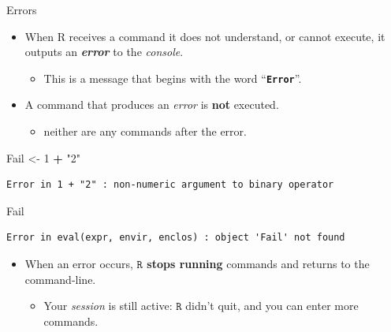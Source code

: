 \documentclass[
  11pt,
  ignorenonframetext,
]{beamer}
\newenvironment{Shaded}{\begin{snugshade}}{\end{snugshade}}
\newcommand{\DecValTok}[1]{\textcolor[rgb]{0.00,0.00,0.81}{#1}}
\newcommand{\ErrorTok}[1]{\textcolor[rgb]{0.64,0.00,0.00}{\textbf{#1}}}
\newcommand{\NormalTok}[1]{#1}
\newcommand{\OtherTok}[1]{\textcolor[rgb]{0.56,0.35,0.01}{#1}}
\newcommand{\SpecialCharTok}[1]{\textcolor[rgb]{0.81,0.36,0.00}{\textbf{#1}}}
\newcommand{\StringTok}[1]{\textcolor[rgb]{0.31,0.60,0.02}{#1}}
\providecommand{\tightlist}{%
  \setlength{\itemsep}{0pt}\setlength{\parskip}{0pt}}
\begin{document}
\begin{frame}[fragile]{Errors}
\protect\hypertarget{errors}{}
\begin{itemize}
\tightlist
\item
  When R receives a command it does not understand, or cannot execute,
  it outputs an \textbf{\emph{error}} to the \emph{console}.

  \begin{itemize}
  \tightlist
  \item
    This is a message that begins with the word
    ``\ErrorTok{\texttt{Error}}''.
  \end{itemize}
\item
  A command that produces an \emph{error} is \textbf{not} executed.

  \begin{itemize}
  \tightlist
  \item
    neither are any commands after the error.
  \end{itemize}
\end{itemize}

\begin{Shaded}
\begin{Highlighting}[]
\NormalTok{Fail }\OtherTok{\textless{}{-}} \DecValTok{1} \SpecialCharTok{+} \StringTok{"2"}
\end{Highlighting}
\end{Shaded}

\begin{verbatim}
Error in 1 + "2" : non-numeric argument to binary operator
\end{verbatim}

\begin{Shaded}
\begin{Highlighting}[]
\NormalTok{Fail}
\end{Highlighting}
\end{Shaded}

\begin{verbatim}
Error in eval(expr, envir, enclos) : object 'Fail' not found
\end{verbatim}

\begin{itemize}
\tightlist
\item
  When an error occurs, \textbf{\(\texttt{R}\) stops running} commands
  and returns to the command-line.

  \begin{itemize}
  \tightlist
  \item
    Your \emph{session} is still active: \(\texttt{R}\) didn't quit, and
    you can enter more commands.
  \end{itemize}
\end{itemize}
\end{frame}
\end{document}
